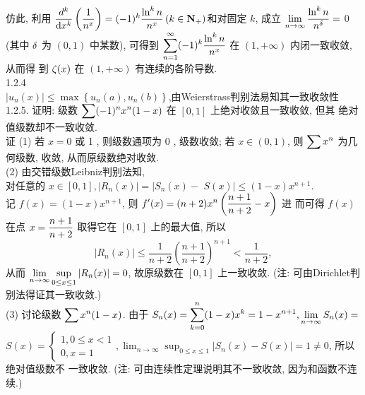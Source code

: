 \documentclass[a4paper,11pt,UTF8]{article}
\begin{document}
仿此, 利用 $\displaystyle \displaystyle \displaystyle \frac{d^k}{\mathrm{d}x^k}\left(\frac{1}{n^x}\right)=(-1)^k \frac{\ln ^k n}{n^x}\left(k \in \mathbf{N}_{+}\right)$和对固定 $k$, 成立 $\displaystyle \displaystyle \displaystyle \lim _{n \rightarrow \infty} \frac{\ln ^k n}{n^\delta}=$ 0 (其中 $\displaystyle \displaystyle \displaystyle \delta$ 为 $(0,1)$ 中某数), 可得到 $\displaystyle \displaystyle \displaystyle \sum_{n=1}^{\infty}(-1)^k \frac{\ln ^k n}{n^x}$ 在 $(1,+\infty)$ 内闭一致收敛, 从而得 到 $\displaystyle \displaystyle \displaystyle \zeta(x)$ 在 $(1,+\infty)$ 有连续的各阶导数.\\
1.2.4\\
$|u_n(x)| \leq \max\left\{u_n(a),u_n(b)\right\}$,由Weierstrass判别法易知其一致收敛性\\
1.2.5. 证明: 级数 $\displaystyle \displaystyle \displaystyle \sum(-1)^n x^n(1-x)$ 在 $[0,1]$ 上绝对收敛且一致收敛, 但其 绝对值级数却不一致收敛.\\
证 (1) 若 $x=0$ 或 1 , 则级数通项为 0 , 级数收敛; 若 $x \in(0,1)$, 则 $\displaystyle \displaystyle \displaystyle \sum x^n$ 为几 何级数, 收敛, 从而原级数绝对收敛.\\
(2) 由交错级数Leibniz判别法知,\\ 对任意的 $x \in[0,1],\left|R_n(x)\right|=\mid S_n(x)-$ $S(x) \mid \leq(1-x) x^{n+1}$.\\ 记 $\displaystyle f(x)=(1-x) x^{n+1}$, 则 $\displaystyle \displaystyle \displaystyle f^{\prime}(x)=(n+2) x^n\left(\frac{n+1}{n+2}-x\right)$ 进 而可得 $\displaystyle f(x)$ 在点 $\displaystyle \displaystyle \displaystyle x=\frac{n+1}{n+2}$ 取得它在 $[0,1]$ 上的最大值, 所以
$$
\left|R_n(x)\right| \leq \frac{1}{n+2}\left(\frac{n+1}{n+2}\right)^{n+1}<\frac{1}{n+2},
$$
从而 $\displaystyle \displaystyle \displaystyle \lim _{n \rightarrow \infty} \sup _{0 \leq x \leq 1}\left|R_n(x)\right|=0$, 故原级数在 $[0,1]$ 上一致收敛. (注: 可由Dirichlet判 别法得证其一致收敛.)\\
(3) 讨论级数 $\displaystyle \displaystyle \displaystyle \sum x^n(1-x)$. 由于 $\displaystyle \displaystyle \displaystyle S_n(x)=\sum_{k=0}^n(1-x) x^k=1-x^{n+1}, \lim _{n \rightarrow \infty} S_n(x)=$ $S(x)=\left\{\begin{array}{l}1,0 \leq x<1 \\ 0, x=1\end{array}, \displaystyle \lim _{n \rightarrow \infty} \sup _{0 \leq x \leq 1}\left|S_n(x)-S(x)\right|=1 \neq 0\right.$, 所以绝对值级数不 一致收敛. (注: 可由连续性定理说明其不一致收敛, 因为和函数不连续.)\\
\end{document}
